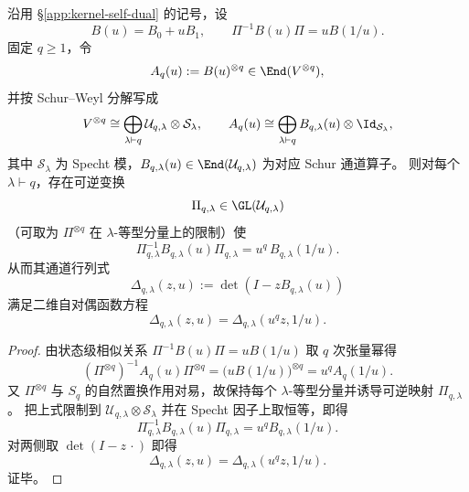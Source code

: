 \begin{theorem}\label{thm:sync-kernel-schur-channel-strict-self-dual-functoriality}
沿用 \S\ref{app:kernel-self-dual} 的记号，设
\[
B(u)=B_0+uB_1,\qquad \Pi^{-1}B(u)\Pi=uB(1/u).
\]
固定 \(q\ge 1\)，令
\[
A_q(u):=B(u)^{\otimes q}\in \End(V^{\otimes q}),
\]
并按 Schur--Weyl 分解写成
\[
V^{\otimes q}\cong \bigoplus_{\lambda\vdash q}\mathcal U_{q,\lambda}\otimes \mathcal S_\lambda,
\qquad
A_q(u)\cong \bigoplus_{\lambda\vdash q} B_{q,\lambda}(u)\otimes \Id_{\mathcal S_\lambda},
\]
其中 \(\mathcal S_\lambda\) 为 Specht 模，\(B_{q,\lambda}(u)\in \End(\mathcal U_{q,\lambda})\) 为对应 Schur 通道算子。
则对每个 \(\lambda\vdash q\)，存在可逆变换
\[
\Pi_{q,\lambda}\in \GL(\mathcal U_{q,\lambda})
\]
（可取为 \(\Pi^{\otimes q}\) 在 \(\lambda\)-等型分量上的限制）使
\[
\Pi_{q,\lambda}^{-1}B_{q,\lambda}(u)\Pi_{q,\lambda}=u^q\,B_{q,\lambda}(1/u).
\]
从而其通道行列式
\[
\Delta_{q,\lambda}(z,u):=\det(I-zB_{q,\lambda}(u))
\]
满足二维自对偶函数方程
\[
\Delta_{q,\lambda}(z,u)=\Delta_{q,\lambda}(u^q z,1/u).
\]
\end{theorem}
\begin{proof}
由状态级相似关系
\(
\Pi^{-1}B(u)\Pi=uB(1/u)
\)
取 \(q\) 次张量幂得
\[
(\Pi^{\otimes q})^{-1}A_q(u)\Pi^{\otimes q}
=
\bigl(uB(1/u)\bigr)^{\otimes q}
=
u^q A_q(1/u).
\]
又 \(\Pi^{\otimes q}\) 与 \(S_q\) 的自然置换作用对易，故保持每个 \(\lambda\)-等型分量并诱导可逆映射 \(\Pi_{q,\lambda}\)。
把上式限制到 \(\mathcal U_{q,\lambda}\otimes\mathcal S_\lambda\) 并在 Specht 因子上取恒等，即得
\[
\Pi_{q,\lambda}^{-1}B_{q,\lambda}(u)\Pi_{q,\lambda}=u^q B_{q,\lambda}(1/u).
\]
对两侧取 \(\det(I-z\,\cdot)\) 即得
\[
\Delta_{q,\lambda}(z,u)=\Delta_{q,\lambda}(u^q z,1/u).
\]
证毕。
\end{proof}


